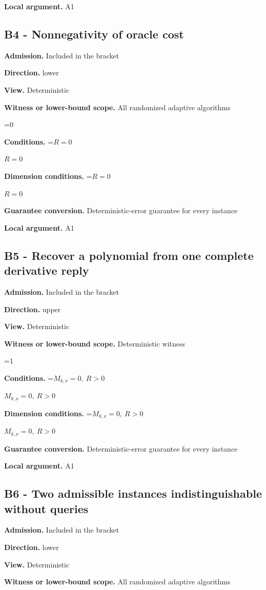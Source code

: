 \documentclass[10pt,a4paper]{article}
\newcommand{\AtlasMath}[1]{\par\begingroup\centering\setbox0=\hbox{$\displaystyle #1$}\ifdim\wd0>1.4\linewidth\typeout{ATLAS WIDE FORMULA: \the\wd0}\fi\ifdim\wd0>\linewidth\resizebox{\linewidth}{!}{\box0}\else\box0\fi\par\endgroup}
\newcommand{\AtlasInlineMath}[1]{\begingroup\setbox0=\hbox{$#1$}\ifdim\wd0>.4\linewidth\endgroup\AtlasMath{#1}\else\endgroup$#1$\fi}
\begin{document}
\textbf{Local argument.} A1

\subsection{B4 - Nonnegativity of oracle cost}
\textbf{Admission.} Included in the bracket

\textbf{Direction.} lower

\textbf{View.} Deterministic

\textbf{Witness or lower-bound scope.} All randomized adaptive algorithms

\AtlasMath{0}
\textbf{Conditions.} \AtlasInlineMath{R=0}

\textbf{Dimension conditions.} \AtlasInlineMath{R=0}

\textbf{Guarantee conversion.} Deterministic-error guarantee for every instance

\textbf{Local argument.} A1

\subsection{B5 - Recover a polynomial from one complete derivative reply}
\textbf{Admission.} Included in the bracket

\textbf{Direction.} upper

\textbf{View.} Deterministic

\textbf{Witness or lower-bound scope.} Deterministic witness

\AtlasMath{1}
\textbf{Conditions.} \AtlasInlineMath{M_{k,\nu}=0,\ R>0}

\textbf{Dimension conditions.} \AtlasInlineMath{M_{k,\nu}=0,\ R>0}

\textbf{Guarantee conversion.} Deterministic-error guarantee for every instance

\textbf{Local argument.} A1

\subsection{B6 - Two admissible instances indistinguishable without queries}
\textbf{Admission.} Included in the bracket

\textbf{Direction.} lower

\textbf{View.} Deterministic

\textbf{Witness or lower-bound scope.} All randomized adaptive algorithms
\end{document}
